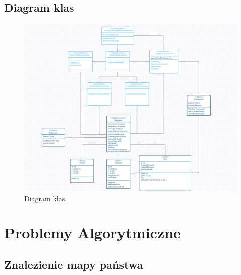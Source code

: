 \documentclass[10pt,a4paper]{article}
\begin{document}
\subsection{Diagram klas}

\begin{figure}[h]
  \includegraphics[width=\linewidth]{./images/diagram_klas.png}
  \caption{Diagram klas.}
  \label{fig:diagram_klas}
\end{figure}

\section{Problemy Algorytmiczne}

\subsection{Znalezienie mapy państwa}
\end{document}
